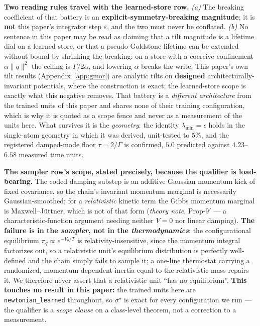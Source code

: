 \documentclass{article}
\begin{document}
\textbf{Two reading rules travel with the learned-store row.} \emph{(a)} The breaking coefficient of that battery is an \textbf{explicit-symmetry-breaking magnitude}; it is \textbf{not} this paper's integrator step $\varepsilon$, and the two must never be conflated. \emph{(b)} No sentence in this paper may be read as claiming that a tilt magnitude is a lifetime dial on a learned store, or that a pseudo-Goldstone lifetime can be extended without bound by shrinking the breaking: on a store with a coercive confinement $\alpha\lVert q\rVert^2$ the ceiling is $\Gamma/2\alpha$, and lowering $\alpha$ breaks the write. This paper's own tilt results (Appendix~\ref{app:gmor}) are analytic tilts on \textbf{designed} architecturally-invariant potentials, where the construction is exact; the learned-store scope is exactly what this negative removes. That battery is a \emph{different architecture} from the trained units of this paper and shares none of their training configuration, which is why it is quoted as a scope fence and never as a measurement of the units here. What survives it is the \emph{geometry}: the identity $\lambda_{\min}=\epsilon$ holds in the single-atom geometry in which it was derived, unit-tested to $5\%$, and the registered damped-mode floor $\tau=2/\Gamma$ is confirmed, $5.0$ predicted against $4.23$--$6.58$ measured time units.

\textbf{The sampler row's scope, stated precisely, because the qualifier is load-bearing.} The coded damping substep is an additive Gaussian momentum kick of fixed covariance, so the chain's invariant momentum marginal is necessarily Gaussian-smoothed; for a \emph{relativistic} kinetic term the Gibbs momentum marginal is Maxwell--J\"uttner, which is not of that form (\emph{theory note}, Prop-9$'$ --- a characteristic-function argument needing neither $V=0$ nor linear damping). \textbf{The failure is in the \emph{sampler}, not in the \emph{thermodynamics}}: the configurational equilibrium $\pi_q\propto e^{-V_\theta/T}$ is relativity-insensitive, since the momentum integral factorizes out, so a relativistic unit's equilibrium distribution is perfectly well-defined and the chain simply fails to sample it; a one-line thermostat carrying a randomized, momentum-dependent inertia equal to the relativistic mass repairs it. We therefore never assert that a relativistic unit ``has no equilibrium''. \textbf{This touches no result in this paper:} the trained units here are \texttt{newtonian\_learned} throughout, so $\sigma^\star$ is exact for every configuration we run --- the qualifier is a \emph{scope clause} on a class-level theorem, not a correction to a measurement.
\end{document}
